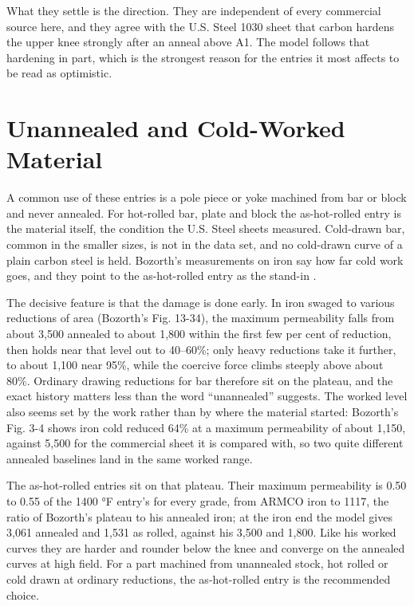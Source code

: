 \documentclass[
  11pt,
]{article}
\begin{document}
What they settle is the direction. They are independent of every commercial source here, and they agree with the U.S. Steel 1030 sheet that carbon hardens the upper knee strongly after an anneal above A1. The model follows that hardening in part, which is the strongest reason for the entries it most affects to be read as optimistic.

\section{Unannealed and Cold-Worked Material}\label{unannealed-and-cold-worked-material}

A common use of these entries is a pole piece or yoke machined from bar or block and never annealed. For hot-rolled bar, plate and block the as-hot-rolled entry is the material itself, the condition the U.S. Steel sheets measured. Cold-drawn bar, common in the smaller sizes, is not in the data set, and no cold-drawn curve of a plain carbon steel is held. Bozorth's measurements on iron say how far cold work goes, and they point to the as-hot-rolled entry as the stand-in \cite{bozorth1951}.

The decisive feature is that the damage is done early. In iron swaged to various reductions of area (Bozorth's Fig. 13-34), the maximum permeability falls from about 3,500 annealed to about 1,800 within the first few per cent of reduction, then holds near that level out to 40--60\%; only heavy reductions take it further, to about 1,100 near 95\%, while the coercive force climbs steeply above about 80\%. Ordinary drawing reductions for bar therefore sit on the plateau, and the exact history matters less than the word ``unannealed'' suggests. The worked level also seems set by the work rather than by where the material started: Bozorth's Fig. 3-4 shows iron cold reduced 64\% at a maximum permeability of about 1,150, against 5,500 for the commercial sheet it is compared with, so two quite different annealed baselines land in the same worked range.

The as-hot-rolled entries sit on that plateau. Their maximum permeability is 0.50 to 0.55 of the 1400 °F entry's for every grade, from ARMCO iron to 1117, the ratio of Bozorth's plateau to his annealed iron; at the iron end the model gives 3,061 annealed and 1,531 as rolled, against his 3,500 and 1,800. Like his worked curves they are harder and rounder below the knee and converge on the annealed curves at high field. For a part machined from unannealed stock, hot rolled or cold drawn at ordinary reductions, the as-hot-rolled entry is the recommended choice.
\end{document}
